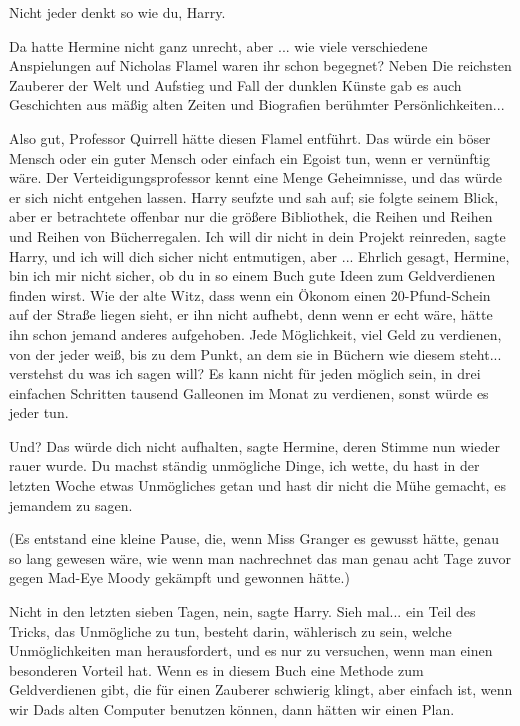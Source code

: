 \glqq{}Nicht jeder denkt so wie du, Harry.\grqq{}

Da hatte Hermine nicht ganz unrecht, aber ... wie viele verschiedene
Anspielungen auf Nicholas Flamel waren ihr schon begegnet? Neben \glqq{}Die
reichsten Zauberer der Welt\grqq{} und \glqq{}Aufstieg und Fall der dunklen
Künste\grqq{} gab es auch \glqq{}Geschichten aus mäßig alten Zeiten\grqq{} und
\glqq{}Biografien berühmter Persönlichkeiten\grqq{}...

\glqq{}Also gut, Professor Quirrell hätte diesen Flamel entführt. Das würde ein
böser Mensch oder ein guter Mensch oder einfach ein Egoist tun, wenn er
vernünftig wäre. Der Verteidigungsprofessor kennt eine Menge Geheimnisse, und
das würde er sich nicht entgehen lassen.\grqq{} Harry seufzte und sah auf; sie
folgte seinem Blick, aber er betrachtete offenbar nur die größere Bibliothek,
die Reihen und Reihen und Reihen von Bücherregalen. \glqq{}Ich will dir nicht in
dein Projekt reinreden\grqq{}, sagte Harry, \glqq{}und ich will dich sicher nicht
entmutigen, aber ... Ehrlich gesagt, Hermine, bin ich mir nicht sicher, ob du in
so einem Buch gute Ideen zum Geldverdienen finden wirst. Wie der alte Witz, dass
wenn ein Ökonom einen 20-Pfund-Schein auf der Straße liegen sieht, er ihn nicht
aufhebt, denn wenn er echt wäre, hätte ihn schon jemand anderes aufgehoben. Jede
Möglichkeit, viel Geld zu verdienen, von der jeder weiß, bis zu dem Punkt, an
dem sie in Büchern wie diesem steht... verstehst du was ich sagen will? Es kann
nicht für jeden möglich sein, in drei einfachen Schritten tausend Galleonen im
Monat zu verdienen, sonst würde es jeder tun.\grqq{}

\glqq{}Und? Das würde dich nicht aufhalten\grqq{}, sagte Hermine, deren Stimme
nun wieder rauer wurde. \glqq{}Du machst ständig unmögliche Dinge, ich wette, du
hast in der letzten Woche etwas Unmögliches getan und hast dir nicht die Mühe
gemacht, es jemandem zu sagen.\grqq{}

(Es entstand eine kleine Pause, die, wenn Miss Granger es gewusst hätte, genau
so lang gewesen wäre, wie wenn man nachrechnet das man genau acht Tage zuvor
gegen Mad-Eye Moody gekämpft und gewonnen hätte.)

\glqq{}Nicht in den letzten sieben Tagen, nein\grqq{}, sagte Harry. \glqq{}Sieh
mal... ein Teil des Tricks, das Unmögliche zu tun, besteht darin, wählerisch zu
sein, welche Unmöglichkeiten man herausfordert, und es nur zu versuchen, wenn
man einen besonderen Vorteil hat. Wenn es in diesem Buch eine Methode zum
Geldverdienen gibt, die für einen Zauberer schwierig klingt, aber einfach ist,
wenn wir Dads alten Computer benutzen können, dann hätten wir einen Plan.\grqq{}

